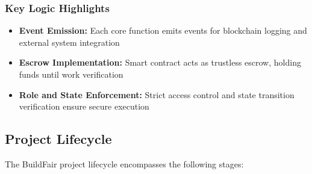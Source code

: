 \documentclass[12pt]{article}
\begin{document}
\subsubsection{Key Logic Highlights}
\begin{itemize}
    \item \textbf{Event Emission:} Each core function emits events for blockchain logging and external system integration
    \item \textbf{Escrow Implementation:} Smart contract acts as trustless escrow, holding funds until work verification
    \item \textbf{Role and State Enforcement:} Strict access control and state transition verification ensure secure execution
\end{itemize}

\subsection{Project Lifecycle}
The BuildFair project lifecycle encompasses the following stages:
\end{document}
